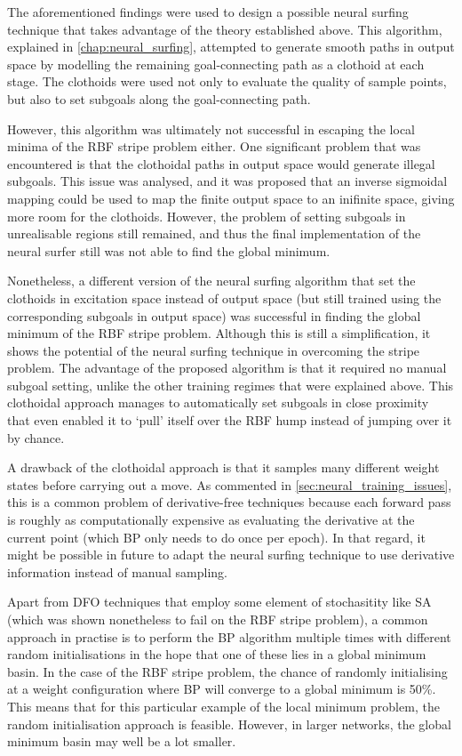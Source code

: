 The aforementioned findings were used to design a possible neural surfing technique that takes advantage of the theory established above.
This algorithm, explained in \ref{chap:neural_surfing}, attempted to generate smooth paths in output space by modelling the remaining goal-connecting path as a clothoid at each stage.
The clothoids were used not only to evaluate the quality of sample points, but also to set subgoals along the goal-connecting path.

However, this algorithm was ultimately not successful in escaping the local minima of the RBF stripe problem either.
One significant problem that was encountered is that the clothoidal paths in output space would generate illegal subgoals.
This issue was analysed, and it was proposed that an inverse sigmoidal mapping could be used to map the finite output space to an inifinite space, giving more room for the clothoids.
However, the problem of setting subgoals in unrealisable regions still remained, and thus the final implementation of the neural surfer still was not able to find the global minimum.

Nonetheless, a different version of the neural surfing algorithm that set the clothoids in excitation space instead of output space (but still trained using the corresponding subgoals in output space) was successful in finding the global minimum of the RBF stripe problem.
Although this is still a simplification, it shows the potential of the neural surfing technique in overcoming the stripe problem.
The advantage of the proposed algorithm is that it required no manual subgoal setting, unlike the other training regimes that were explained above.
This clothoidal approach manages to automatically set subgoals in close proximity that even enabled it to `pull' itself over the RBF hump instead of jumping over it by chance.

A drawback of the clothoidal approach is that it samples many different weight states before carrying out a move.
As commented in \ref{sec:neural_training_issues}, this is a common problem of derivative-free techniques because each forward pass is roughly as computationally expensive as evaluating the derivative at the current point (which BP only needs to do once per epoch).
In that regard, it might be possible in future to adapt the neural surfing technique to use derivative information instead of manual sampling.

Apart from DFO techniques that employ some element of stochasitity like SA (which was shown nonetheless to fail on the RBF stripe problem),
a common approach in practise is to perform the BP algorithm multiple times with different random initialisations in the hope that one of these lies in a global minimum basin.
In the case of the RBF stripe problem, the chance of randomly initialising at a weight configuration where BP will converge to a global minimum is 50\%.
This means that for this particular example of the local minimum problem, the random initialisation approach is feasible.
However, in larger networks, the global minimum basin may well be a lot smaller.

